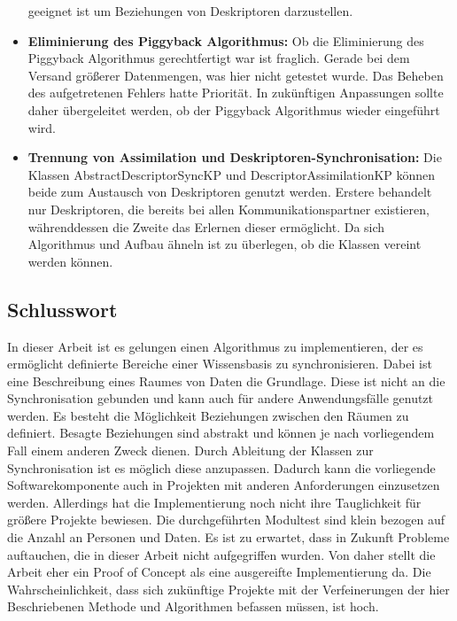 \documentclass[a4paper]{article}
\begin{document}
\begin{itemize}
		geeignet ist um Beziehungen von Deskriptoren darzustellen.
		\item \textbf{Eliminierung des Piggyback Algorithmus:} Ob die 
		Eliminierung des Piggyback Algorithmus gerechtfertigt war ist fraglich.
		Gerade bei dem Versand größerer Datenmengen, was hier nicht getestet wurde.
		Das Beheben des aufgetretenen Fehlers hatte Priorität. In zukünftigen
		Anpassungen sollte daher übergeleitet werden, ob der Piggyback Algorithmus
		wieder eingeführt wird.
		\newpage
		\item \textbf{Trennung von Assimilation und Deskriptoren-Synchronisation:}
		Die Klassen AbstractDescriptorSyncKP und DescriptorAssimilationKP 
		können beide zum Austausch von Deskriptoren genutzt werden. 
		Erstere behandelt nur Deskriptoren, die bereits bei allen
		Kommunikationspartner existieren, währenddessen die Zweite das Erlernen
		dieser ermöglicht. Da sich	Algorithmus und Aufbau ähneln ist zu überlegen,
		ob die Klassen vereint werden können.	
	\end{itemize} 
	
	\subsection{Schlusswort}
	
	In dieser Arbeit ist es gelungen einen Algorithmus zu implementieren, der
	es ermöglicht definierte Bereiche einer Wissensbasis zu synchronisieren.
	Dabei ist eine Beschreibung eines Raumes von Daten die Grundlage. Diese
	ist nicht an die Synchronisation gebunden und kann auch
	für andere Anwendungsfälle genutzt werden. Es besteht die Möglichkeit Beziehungen
	zwischen den Räumen zu definiert. Besagte Beziehungen sind abstrakt und können
	je nach	vorliegendem Fall einem anderen Zweck dienen. Durch Ableitung der 
	Klassen zur Synchronisation ist	es möglich diese anzupassen. Dadurch kann 
	die vorliegende Softwarekomponente auch in Projekten mit
	anderen Anforderungen einzusetzen werden. Allerdings hat die Implementierung
	noch nicht ihre Tauglichkeit für größere Projekte bewiesen. Die 
	durchgeführten Modultest sind klein bezogen auf die Anzahl an Personen
	und Daten. Es ist zu erwartet, dass in Zukunft Probleme auftauchen,
	die in dieser Arbeit nicht aufgegriffen wurden. Von daher stellt die Arbeit
	eher ein Proof of Concept als eine ausgereifte Implementierung da. 
	Die Wahrscheinlichkeit, dass sich zukünftige Projekte mit der Verfeinerungen 
	der hier Beschriebenen Methode und Algorithmen befassen müssen, ist hoch. 
	
\end{document}
